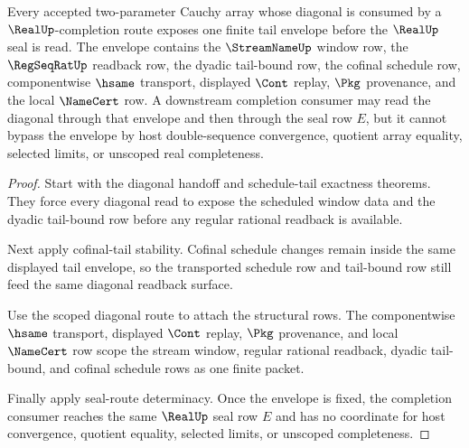 \begin{theorem}
\label{thm:cauchy-double-sequence-diagonal-tail-envelope}
Every accepted two-parameter Cauchy array whose diagonal is consumed by a $\RealUp$-completion route exposes one finite tail envelope before the $\RealUp$ seal is read. The envelope contains the $\StreamNameUp$ window row, the $\RegSeqRatUp$ readback row, the dyadic tail-bound row, the cofinal schedule row, componentwise $\hsame$ transport, displayed $\Cont$ replay, $\Pkg$ provenance, and the local $\NameCert$ row. A downstream completion consumer may read the diagonal through that envelope and then through the seal row $E$, but it cannot bypass the envelope by host double-sequence convergence, quotient array equality, selected limits, or unscoped real completeness.
\end{theorem}
\begin{proof}
Start with the diagonal handoff and schedule-tail exactness theorems. They force every diagonal read to expose the scheduled window data and the dyadic tail-bound row before any regular rational readback is available.

Next apply cofinal-tail stability. Cofinal schedule changes remain inside the same displayed tail envelope, so the transported schedule row and tail-bound row still feed the same diagonal readback surface.

Use the scoped diagonal route to attach the structural rows. The componentwise $\hsame$ transport, displayed $\Cont$ replay, $\Pkg$ provenance, and local $\NameCert$ row scope the stream window, regular rational readback, dyadic tail-bound, and cofinal schedule rows as one finite packet.

Finally apply seal-route determinacy. Once the envelope is fixed, the completion consumer reaches the same $\RealUp$ seal row $E$ and has no coordinate for host convergence, quotient equality, selected limits, or unscoped completeness.
\end{proof}


